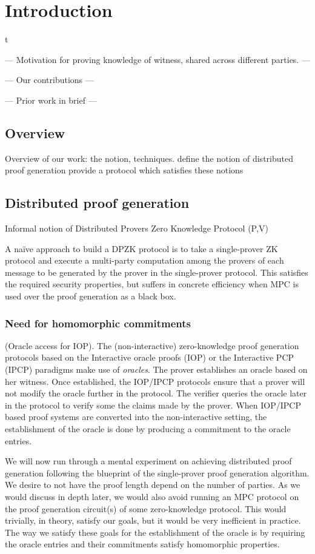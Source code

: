 \section{Introduction} \label{sec:intro}
t

--- Motivation for proving knowledge of witness, shared across different parties. ---

--- Our contributions ---

--- Prior work in brief ---

\subsection{Overview}
Overview of our work: the notion, techniques.
define the notion of distributed proof generation
provide a protocol which satisfies these notions

\subsection*{Distributed proof generation}
Informal notion of Distributed Provers Zero Knowledge Protocol (P,V)

A na\"ive approach to build a DPZK protocol is to take a single-prover ZK protocol and execute a multi-party computation among the provers of each message to be generated by the prover in the single-prover protocol. This satisfies the required security properties, but suffers in concrete efficiency when MPC is used over the proof generation as a black box. 

\subsubsection*{Need for homomorphic commitments} 
(Oracle access for IOP).
The (non-interactive) zero-knowledge proof generation protocols based on the Interactive oracle proofs (IOP) or the Interactive PCP (IPCP) paradigms make use of \textit{oracles}. The prover establishes an oracle based on her witness. Once established, the IOP/IPCP protocols ensure that a prover will not modify the oracle further in the protocol. The verifier queries the oracle later in the protocol to verify some the claims made by the prover. When IOP/IPCP based proof systems are converted into the non-interactive setting, the establishment of the oracle is done by producing a commitment to the oracle entries.

We will now run through a mental experiment on achieving distributed proof generation following the blueprint of the single-prover proof generation algorithm. We desire to not have the proof length depend on the number of parties. As we would discuss in depth later, we would also avoid running an MPC protocol on the proof generation circuit(s) of some zero-knowledge protocol. This would trivially, in theory, satisfy our goals, but it would be very inefficient in practice. The way we satisfy these goals for the establishment of the oracle is by requiring the oracle entries and their commitments satisfy homomorphic properties.

